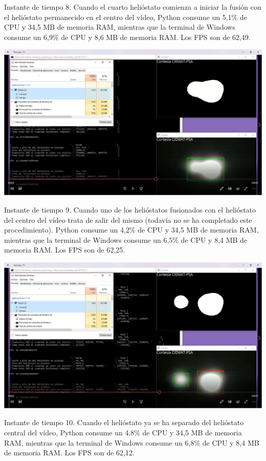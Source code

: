 \documentclass[12pt]{article}
\begin{document}
Instante de tiempo 8. Cuando el cuarto helióstato comienza a iniciar la fusión con el helióstato permanecido en el centro del vídeo, Python consume un 5,1\% de CPU y 34,5 MB de memoria RAM, mientras que la terminal de Windows consume un 6,9\% de CPU y 8,6 MB de memoria RAM. Los FPS son de 62,49.


\includegraphics[width=\textwidth]{CapturasRendimientoSoftware1/Imagen9.png}

Instante de tiempo 9. Cuando uno de los helióstatos fusionados con el helióstato del centro del vídeo trata de salir del mismo (todavía no se ha completado este procedimiento). Python consume un 4,2\% de CPU y 34,5 MB de memoria RAM, mientras que la terminal de Windows consume un 6,5\% de CPU y 8,4 MB de memoria RAM. Los FPS son de 62,25.


\includegraphics[width=\textwidth]{CapturasRendimientoSoftware1/Imagen10.png}

Instante de tiempo 10. Cuando el helióstato ya se ha separado del helióstato central del vídeo, Python consume un 4,8\% de CPU y 34,5 MB de memoria RAM, mientras que la terminal de Windows consume un 6,8\% de CPU y 8,4 MB de memoria RAM. Los FPS son de 62,12.
\end{document}
